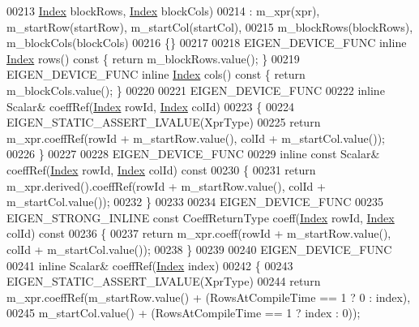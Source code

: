 \begin{DoxyCode}
00213           \hyperlink{namespace_eigen_a62e77e0933482dafde8fe197d9a2cfde}{Index} blockRows, \hyperlink{namespace_eigen_a62e77e0933482dafde8fe197d9a2cfde}{Index} blockCols)
00214       : m\_xpr(xpr), m\_startRow(startRow), m\_startCol(startCol),
00215                     m\_blockRows(blockRows), m\_blockCols(blockCols)
00216     \{\}
00217 
00218     EIGEN\_DEVICE\_FUNC \textcolor{keyword}{inline} \hyperlink{namespace_eigen_a62e77e0933482dafde8fe197d9a2cfde}{Index} rows()\textcolor{keyword}{ const }\{ \textcolor{keywordflow}{return} m\_blockRows.value(); \}
00219     EIGEN\_DEVICE\_FUNC \textcolor{keyword}{inline} \hyperlink{namespace_eigen_a62e77e0933482dafde8fe197d9a2cfde}{Index} cols()\textcolor{keyword}{ const }\{ \textcolor{keywordflow}{return} m\_blockCols.value(); \}
00220 
00221     EIGEN\_DEVICE\_FUNC
00222     \textcolor{keyword}{inline} Scalar& coeffRef(\hyperlink{namespace_eigen_a62e77e0933482dafde8fe197d9a2cfde}{Index} rowId, \hyperlink{namespace_eigen_a62e77e0933482dafde8fe197d9a2cfde}{Index} colId)
00223     \{
00224       EIGEN\_STATIC\_ASSERT\_LVALUE(XprType)
00225       \textcolor{keywordflow}{return} m\_xpr.coeffRef(rowId + m\_startRow.value(), colId + m\_startCol.value());
00226     \}
00227 
00228     EIGEN\_DEVICE\_FUNC
00229     \textcolor{keyword}{inline} \textcolor{keyword}{const} Scalar& coeffRef(\hyperlink{namespace_eigen_a62e77e0933482dafde8fe197d9a2cfde}{Index} rowId, \hyperlink{namespace_eigen_a62e77e0933482dafde8fe197d9a2cfde}{Index} colId)\textcolor{keyword}{ const}
00230 \textcolor{keyword}{    }\{
00231       \textcolor{keywordflow}{return} m\_xpr.derived().coeffRef(rowId + m\_startRow.value(), colId + m\_startCol.value());
00232     \}
00233 
00234     EIGEN\_DEVICE\_FUNC
00235     EIGEN\_STRONG\_INLINE \textcolor{keyword}{const} CoeffReturnType coeff(\hyperlink{namespace_eigen_a62e77e0933482dafde8fe197d9a2cfde}{Index} rowId, \hyperlink{namespace_eigen_a62e77e0933482dafde8fe197d9a2cfde}{Index} colId)\textcolor{keyword}{ const}
00236 \textcolor{keyword}{    }\{
00237       \textcolor{keywordflow}{return} m\_xpr.coeff(rowId + m\_startRow.value(), colId + m\_startCol.value());
00238     \}
00239 
00240     EIGEN\_DEVICE\_FUNC
00241     \textcolor{keyword}{inline} Scalar& coeffRef(\hyperlink{namespace_eigen_a62e77e0933482dafde8fe197d9a2cfde}{Index} index)
00242     \{
00243       EIGEN\_STATIC\_ASSERT\_LVALUE(XprType)
00244       \textcolor{keywordflow}{return} m\_xpr.coeffRef(m\_startRow.value() + (RowsAtCompileTime == 1 ? 0 : index),
00245                             m\_startCol.value() + (RowsAtCompileTime == 1 ? index : 0));

\end{DoxyCode}
